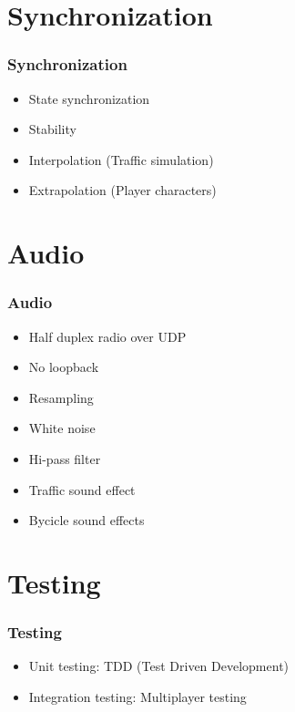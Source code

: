 \documentclass{beamer}
\begin{document}
\section{Synchronization}
\begin{frame}
	\frametitle{Synchronization}
\begin{itemize}
	\item State synchronization 
	\item Stability 
	\item Interpolation (Traffic simulation)
	\item Extrapolation (Player characters)
\end{itemize}
\end{frame}

\section{Audio}
\begin{frame}
	\frametitle{Audio}
	\begin{itemize}
		\item Half duplex radio over UDP
		\item No loopback 
		\item Resampling 
		\item White noise 
		\item Hi-pass filter
		\item Traffic sound effect
		\item Bycicle sound effects 
	\end{itemize}
\end{frame}


\section{Testing}
\begin{frame}
	\frametitle{Testing}
	\begin{itemize}
\item Unit testing: TDD (Test Driven Development)
\item Integration testing: Multiplayer testing 
	\end{itemize}
\end{frame}
\end{document}
